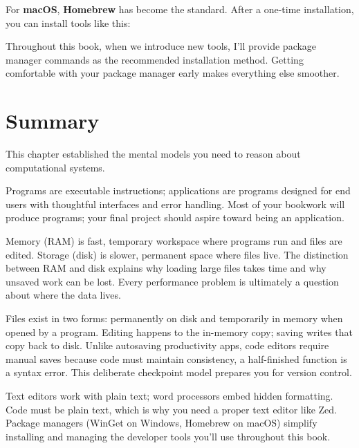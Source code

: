 \documentclass[
  letterpaper,
  DIV=11,
  numbers=noendperiod]{scrreprt}
\newenvironment{Shaded}{\begin{snugshade}}{\end{snugshade}}
\newcommand{\ExtensionTok}[1]{\textcolor[rgb]{0.00,0.23,0.31}{#1}}
\newcommand{\NormalTok}[1]{\textcolor[rgb]{0.00,0.23,0.31}{#1}}
\begin{document}
For \textbf{macOS}, \textbf{Homebrew} has become the standard. After a
one-time installation, you can install tools like this:

\begin{codelisting}

\caption{\texttt{terminal (zsh)}}

\begin{Shaded}
\end{Shaded}

\end{codelisting}

Throughout this book, when we introduce new tools, I'll provide package
manager commands as the recommended installation method. Getting
comfortable with your package manager early makes everything else
smoother.

\section{Summary}\label{summary}

This chapter established the mental models you need to reason about
computational systems.

Programs are executable instructions; applications are programs designed
for end users with thoughtful interfaces and error handling. Most of
your bookwork will produce programs; your final project should aspire
toward being an application.

Memory (RAM) is fast, temporary workspace where programs run and files
are edited. Storage (disk) is slower, permanent space where files live.
The distinction between RAM and disk explains why loading large files
takes time and why unsaved work can be lost. Every performance problem
is ultimately a question about where the data lives.

Files exist in two forms: permanently on disk and temporarily in memory
when opened by a program. Editing happens to the in-memory copy; saving
writes that copy back to disk. Unlike autosaving productivity apps, code
editors require manual saves because code must maintain consistency, a
half-finished function is a syntax error. This deliberate checkpoint
model prepares you for version control.

Text editors work with plain text; word processors embed hidden
formatting. Code must be plain text, which is why you need a proper text
editor like Zed. Package managers (WinGet on Windows, Homebrew on macOS)
simplify installing and managing the developer tools you'll use
throughout this book.
\end{document}
